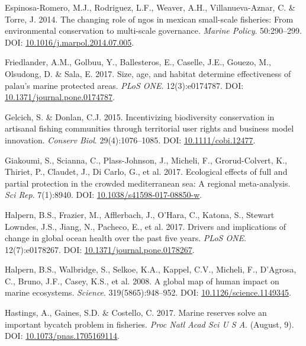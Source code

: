 \documentclass[12pt,]{article}
\begin{document}
\hypertarget{ref-espinosaromero_2014-PY}{}
Espinosa-Romero, M.J., Rodriguez, L.F., Weaver, A.H., Villanueva-Aznar,
C. \& Torre, J. 2014. The changing role of ngos in mexican small-scale
fisheries: From environmental conservation to multi-scale governance.
\emph{Marine Policy}. 50:290--299. DOI:
\href{https://doi.org/10.1016/j.marpol.2014.07.005}{10.1016/j.marpol.2014.07.005}.

\hypertarget{ref-friedlander_2017-oI}{}
Friedlander, A.M., Golbuu, Y., Ballesteros, E., Caselle, J.E., Gouezo,
M., Olsudong, D. \& Sala, E. 2017. Size, age, and habitat determine
effectiveness of palau's marine protected areas. \emph{PLoS ONE}.
12(3):e0174787. DOI:
\href{https://doi.org/10.1371/journal.pone.0174787}{10.1371/journal.pone.0174787}.

\hypertarget{ref-gelcich_2015-Gw}{}
Gelcich, S. \& Donlan, C.J. 2015. Incentivizing biodiversity
conservation in artisanal fishing communities through territorial user
rights and business model innovation. \emph{Conserv Biol}.
29(4):1076--1085. DOI:
\href{https://doi.org/10.1111/cobi.12477}{10.1111/cobi.12477}.

\hypertarget{ref-giakoumi_2017-V2}{}
Giakoumi, S., Scianna, C., Plass-Johnson, J., Micheli, F.,
Grorud-Colvert, K., Thiriet, P., Claudet, J., Di Carlo, G., et al. 2017.
Ecological effects of full and partial protection in the crowded
mediterranean sea: A regional meta-analysis. \emph{Sci Rep}. 7(1):8940.
DOI:
\href{https://doi.org/10.1038/s41598-017-08850-w}{10.1038/s41598-017-08850-w}.

\hypertarget{ref-halpern_2017-Zi}{}
Halpern, B.S., Frazier, M., Afflerbach, J., O'Hara, C., Katona, S.,
Stewart Lowndes, J.S., Jiang, N., Pacheco, E., et al. 2017. Drivers and
implications of change in global ocean health over the past five years.
\emph{PLoS ONE}. 12(7):e0178267. DOI:
\href{https://doi.org/10.1371/journal.pone.0178267}{10.1371/journal.pone.0178267}.

\hypertarget{ref-halpern_2008-dK}{}
Halpern, B.S., Walbridge, S., Selkoe, K.A., Kappel, C.V., Micheli, F.,
D'Agrosa, C., Bruno, J.F., Casey, K.S., et al. 2008. A global map of
human impact on marine ecosystems. \emph{Science}. 319(5865):948--952.
DOI:
\href{https://doi.org/10.1126/science.1149345}{10.1126/science.1149345}.

\hypertarget{ref-hastings_2017-sm}{}
Hastings, A., Gaines, S.D. \& Costello, C. 2017. Marine reserves solve
an important bycatch problem in fisheries. \emph{Proc Natl Acad Sci U S
A}. (August, 9). DOI:
\href{https://doi.org/10.1073/pnas.1705169114}{10.1073/pnas.1705169114}.
\end{document}
